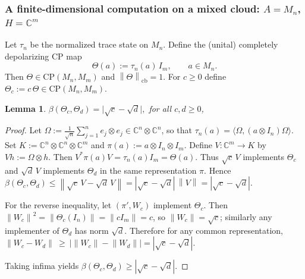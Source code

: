 \documentclass[11pt]{amsart}
\newtheorem{lemma}[theorem]{Lemma}
\theoremstyle{definition}
\theoremstyle{remark}
\newcommand{\C}{\mathbb C}
\newcommand{\1}{\mathbbm{1}}
\newcommand{\cb}{\mathrm{cb}}
\newcommand{\CP}{\mathrm{CP}}
\newcommand{\norm}[1]{\left\lVert #1\right\rVert}
\begin{document}
\subsubsection{A finite-dimensional computation on a mixed cloud: $A=M_n$, $H=\C^m$}


Let $\tau_n$ be the normalized trace state on $M_n$.
Define the (unital) completely depolarizing CP map
\begin{equation}\label{eq:depolarizing}
\Theta(a):=\tau_n(a)\,I_m,\qquad a\in M_n.
\end{equation}
Then $\Theta\in\CP(M_n,M_m)$ and $\norm{\Theta}_{\cb}=1$. For $c\ge 0$ define $\Theta_c:=c\,\Theta \in \CP(M_n,M_m)$.

\begin{lemma}
\label{lem:bures-ray}
$\beta(\Theta_c,\Theta_d)=\bigl|\sqrt{c}-\sqrt{d}\bigr|,$ for all $c,d\ge 0$,
\end{lemma}

\begin{proof}
Let $\Omega:=\frac1{\sqrt n}\sum_{j=1}^n e_j\otimes e_j\in \C^n\otimes\C^n$, so that
$\tau_n(a)=\langle \Omega,(a\otimes I_n)\Omega\rangle$.
Set $K:=\C^n\otimes\C^n\otimes \C^m$ and $\pi(a):=a\otimes I_n\otimes I_m$.
Define $V:\C^m\to K$ by $Vh:=\Omega\otimes h$. Then $V^*\pi(a)V=\tau_n(a)I_m=\Theta(a)$.
Thus $\sqrt c\,V$ implements $\Theta_c$ and $\sqrt d\,V$ implements $\Theta_d$ in the same representation $\pi$. Hence $
\beta(\Theta_c,\Theta_d)\le \norm{\sqrt c\,V-\sqrt d\,V}
=|\sqrt c-\sqrt d|\,\norm{V}
=|\sqrt c-\sqrt d|.$

For the reverse inequality, let $(\pi',W_c)$ implement $\Theta_c$.
Then $\norm{W_c}^2=\norm{\Theta_c(I_n)}=\norm{cI_m}=c$, so $\norm{W_c}=\sqrt c$; similarly any implementer of $\Theta_d$
has norm $\sqrt d$. Therefore for any common representation, $\norm{W_c-W_d}\ \ge\ \bigl|\norm{W_c}-\norm{W_d}\bigr|=|\sqrt c-\sqrt d|.$

Taking infima yields $\beta(\Theta_c,\Theta_d)\ge |\sqrt c-\sqrt d|$.
\end{proof}
\end{document}
